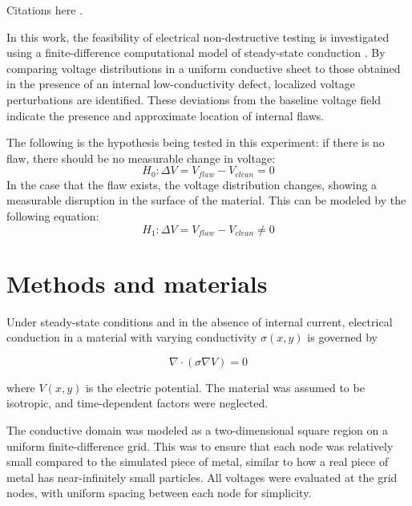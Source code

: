 \documentclass[10pt,journal,twoside]{IEEEtran} %
\begin{document}
Citations here \cite{ayyagari:2024:computational,baru:2024:demonstrating,cohen:2024:visualizing,edwards:2024:electric,kumar:2024:mapping}. 

In this work, the feasibility of electrical non-destructive testing is investigated using a finite-difference computational model of steady-state conduction \cite{press:1992:numerical}. By comparing voltage distributions in a uniform conductive sheet to those obtained in the presence of an internal low-conductivity defect, localized voltage perturbations are identified. These deviations from the baseline voltage field indicate the presence and approximate location of internal flaws.

The following is the hypothesis being tested in this experiment: if there is no flaw, there should be no measurable change in voltage:
\begin{equation} 
H_0: \Delta V = V_{flaw} - V_{clean} = 0
\end{equation}
In the case that the flaw exists, the voltage distribution changes, showing a measurable disruption in the surface of the material. This can be modeled by the following equation:
\begin{equation}
H_1: \Delta V = V_{flaw} - V_{clean} \neq 0
\end{equation}





\section{Methods and materials}
Under steady-state conditions and in the absence of internal current, electrical conduction in a material with varying conductivity $\sigma(x,y)$ is governed by

\begin{equation}
\nabla \cdot (\sigma \nabla V) = 0
\label{conductivity equation}
\end{equation} 

where $V(x,y)$ is the electric potential. The material was assumed to be isotropic, and time-dependent factors were neglected.

The conductive domain was modeled as a two-dimensional square region on a uniform  finite-difference grid. This was to ensure that each node was relatively small compared to the simulated piece of metal, similar to how a real piece of metal has near-infinitely small particles. All voltages were evaluated at the grid nodes, with uniform spacing between each node for simplicity.
\end{document}
